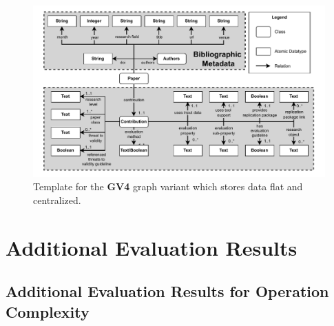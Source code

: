 \begin{figure}[H]
    \centering
    \includegraphics[width=0.90\linewidth]{figures/orkg/template_overview-flat_centralized.drawio.pdf}
    \caption[Template for Fourth Graph Variant]{Template for the \textbf{GV4} graph variant which stores data flat and centralized.}
\end{figure}


\section{Additional Evaluation Results}
\label{sec:appendix:additioal_evaluation_results}

\subsection{Additional Evaluation Results for Operation Complexity}
\label{sec:appendix:additional_evaluation_results_operation_complexity}

